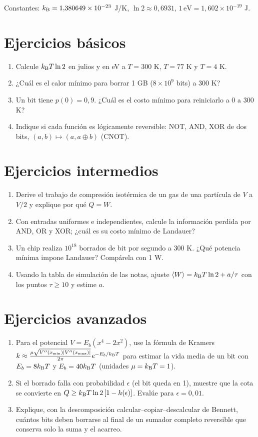 \documentclass[11pt,a4paper]{article}
\begin{document}
Constantes: $k_{\mathrm B}=1{,}380649\times10^{-23}$ J/K, $\ln2\approx0{,}6931$, $1\,\text{eV}=1{,}602\times10^{-19}$ J.

\section{Ejercicios básicos}
\begin{enumerate}[label=\textbf{B\arabic*.}]
\item Calcule $k_{\mathrm B} T\ln2$ en julios y en eV a $T=300$ K, $T=77$ K y $T=4$ K.
\item ¿Cuál es el calor mínimo para borrar 1 GB ($8\times10^9$ bits) a 300 K?
\item Un bit tiene $p(0)=0{,}9$. ¿Cuál es el costo mínimo para reiniciarlo a 0 a 300 K?
\item Indique si cada función es lógicamente reversible: NOT, AND, XOR de dos bits, $(a,b)\mapsto(a,a\oplus b)$ (CNOT).
\end{enumerate}

\section{Ejercicios intermedios}
\begin{enumerate}[label=\textbf{I\arabic*.}]
\item Derive el trabajo de compresión isotérmica de un gas de una partícula de $V$ a $V/2$ y explique por qué $Q=W$.
\item Con entradas uniformes e independientes, calcule la información perdida por AND, OR y XOR; ¿cuál es su costo mínimo de Landauer?
\item Un chip realiza $10^{18}$ borrados de bit por segundo a 300 K. ¿Qué potencia mínima impone Landauer? Compárela con 1 W.
\item Usando la tabla de simulación de las notas, ajuste $\langle W\rangle=k_{\mathrm B} T\ln2+a/\tau$ con los puntos $\tau\ge10$ y estime $a$.
\end{enumerate}

\section{Ejercicios avanzados}
\begin{enumerate}[label=\textbf{A\arabic*.}]
\item Para el potencial $V=E_b(x^4-2x^2)$, use la fórmula de Kramers $k\approx\frac{\mu\sqrt{V''(x_{\min})|V''(x_{\max})|}}{2\pi}e^{-E_b/k_{\mathrm B} T}$ para estimar la vida media de un bit con $E_b=8k_{\mathrm B} T$ y $E_b=40k_{\mathrm B} T$ (unidades $\mu=k_{\mathrm B} T=1$).
\item Si el borrado falla con probabilidad $\epsilon$ (el bit queda en 1), muestre que la cota se convierte en $Q\ge k_{\mathrm B} T\ln2\,[1-h(\epsilon)]$. Evalúe para $\epsilon=0{,}01$.
\item Explique, con la descomposición calcular--copiar--descalcular de Bennett, cuántos bits deben borrarse al final de un sumador completo reversible que conserva solo la suma y el acarreo.
\end{enumerate}
\end{document}
